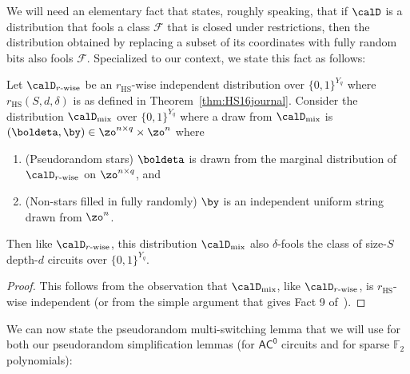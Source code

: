 \documentclass{toc}
\theoremstyle{plain}
\newcommand{\acz}{\mathsf{AC^0}}
\renewcommand{\F}{\mathds{F}}
\begin{document}
We will need an elementary fact that states, roughly speaking, that if $\calD$ is a distribution that fools a class $\mathscr{F}$ that is closed under restrictions, then the distribution obtained by replacing a subset of its coordinates with fully random bits also fools $\mathscr{F}$. Specialized to our context, we state this fact as follows: 


\begin{proposition}
\label{prop:swap} 
Let $\calD_{r\text{-}\mathrm{wise}}$ be an $r_{\mathrm{HS}}$-wise independent distribution over $\{0,1\}^{Y_q}$ where $r_{\mathrm{HS}}(S,d,\delta)$ is as defined in Theorem~\ref{thm:HS16journal}.  Consider the distribution $\calD_{\mathrm{mix}}$ over $\{0,1\}^{Y_q}$ where a draw from $\calD_{\mathrm{mix}}$ is $(\boldeta,\by) \in \zo^{n\times q}\times \zo^n$ where 
\begin{enumerate}
\item (Pseudorandom stars) $\boldeta$ is drawn from the marginal distribution of $\calD_{r\text{-}\mathrm{wise}}$ on $\zo^{n\times q}$, and 
\item (Non-stars filled in fully randomly) $\by$ is an independent uniform string drawn from $\zo^n$. 
\end{enumerate} 
Then like $\calD_{r\text{-}\mathrm{wise}}$, this distribution $\calD_{\mathrm{mix}}$ also $\delta$-fools the class of size-$S$ depth-$d$ circuits over $\{0,1\}^{Y_q}$.
\end{proposition} 


\begin{proof}
This follows from the observation that $\calD_{\mathrm{mix}}$, like $\calD_{r\text{-}\mathrm{wise}}$, is $r_{\mathrm{HS}}$-wise independent
(or from the simple argument that gives Fact 9 of~\cite{TX13}). 
\end{proof} 

We can now state the pseudorandom multi-switching lemma that we will use for both our pseudorandom simplification lemmas (for $\acz$ circuits and for sparse $\F_2$ polynomials): 
\end{document}
